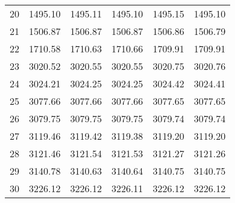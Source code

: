 \documentclass[10pt,oneside]{article}
\begin{document}
\begin{table}[h!]
\begin{tabular}{cccccc}
20 &   1495.10 & 1495.11 &    1495.10 & 1495.15 &   1495.10 \\
21 &   1506.87 & 1506.87 &    1506.87 & 1506.86 &   1506.79 \\
22 &   1710.58 & 1710.63 &    1710.66 & 1709.91 &   1709.91 \\
23 &   3020.52 & 3020.55 &    3020.55 & 3020.75 &   3020.76 \\
24 &   3024.21 & 3024.25 &    3024.25 & 3024.42 &   3024.41 \\
25 &   3077.66 & 3077.66 &    3077.66 & 3077.65 &   3077.65 \\
26 &   3079.75 & 3079.75 &    3079.75 & 3079.74 &   3079.74 \\
27 &   3119.46 & 3119.42 &    3119.38 & 3119.20 &   3119.20 \\
28 &   3121.46 & 3121.54 &    3121.53 & 3121.27 &   3121.26 \\
29 &   3140.78 & 3140.63 &    3140.64 & 3140.75 &   3140.75 \\
30 &   3226.12 & 3226.12 &    3226.11 & 3226.12 &   3226.12 \\
\bottomrule
\end{tabular}
\end{table}
\end{document}
